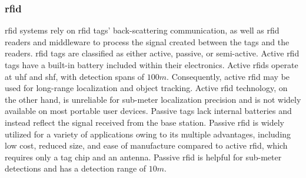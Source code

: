 \subsubsection{\acf{rfid}}
\acf{rfid} systems rely on \ac{rfid} tags' back-scattering communication, as well as \ac{rfid} readers and middleware to process the signal created between the tags and the readers\cite{tesoriero2010improving}.
\ac{rfid} tags are classified as either active, passive, or semi-active.
Active \ac{rfid} tags have a built-in battery included within their electronics.
Active \ac{rfid}s operate at \ac{uhf} and \ac{shf}, with detection spans of $100 m$.
Consequently, active \ac{rfid} may be used for long-range localization and object tracking\cite{deak2012survey}.
Active \ac{rfid} technology, on the other hand, is unreliable for sub-meter localization precision and is not widely available on most portable user devices.
Passive tags lack internal batteries and instead reflect the signal received from the base station.
Passive \ac{rfid} is widely utilized for a variety of applications owing to its multiple advantages, including low cost, reduced size, and ease of manufacture compared to active \ac{rfid}, which requires only a tag chip and an antenna.
Passive \ac{rfid} is helpful for sub-meter detections and has a detection range of $10 m$\cite{deak2012survey}.


